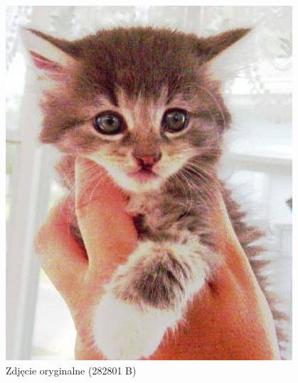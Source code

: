 \begin{figure}[H]
  \centering
  \begin{minipage}[b]{0.25\textwidth}
    \includegraphics[width=\textwidth]{photos/original}
    \caption{Zdjęcie oryginalne (282801 B)\\\\\\\\}
  \end{minipage}
  \hfill
  \begin{minipage}[b]{0.25\textwidth}

\end{minipage}
\end{figure}
